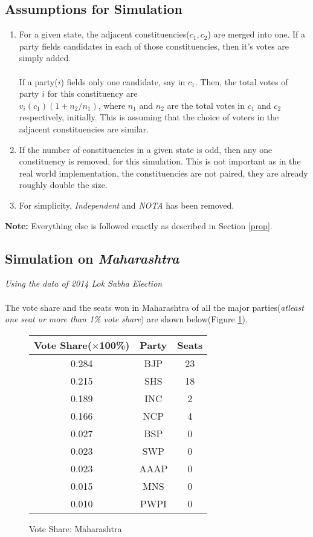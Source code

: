\documentclass{article}
\begin{document}
\subsection{Assumptions for Simulation}
\begin{enumerate}
\item For a given state, the adjacent constituencies($c_1,c_2$) are merged into one. If a party fields candidates in each of those constituencies, then it's votes are simply added. \\ \\
If a party($i$) fields only one candidate, say in $c_1$. Then, the total votes of party $i$ for this constituency are \\$v_i(c_1)(1+n_2/n_1)$, where  $n_1$ and $n_2$ are the total votes in $c_1$ and $c_2$ respectively, initially. This is assuming that the choice of voters in the adjacent constituencies are similar.
\item If the number of constituencies in a given state is odd, then any one constituency is removed, for this simulation. This is not important as in the real world implementation, the constituencies are not paired, they are already roughly double the size.
\item For simplicity, \emph{Independent} and \emph{NOTA} has been removed.
\end{enumerate}
\textbf{Note:} Everything else is followed exactly as described in Section \ref{prop}.

\subsection{Simulation on \emph{Maharashtra}}
\emph{Using the data of 2014 Lok Sabha Election}\\ \\
The vote share and the seats won in Maharashtra of all the major parties(\emph{atleast one seat or more than 1\% vote share}) are shown below(Figure \ref{perc}). 

\begin{figure}[h!]
\begin{center}
\begin{tabular}{|c|c|c|}
\hline
\textbf{Vote Share($\times$100\%)} & \textbf{Party} & \textbf{Seats}\\
\hline
0.284 & BJP & 23\\
0.215 & SHS & 18\\
0.189&INC & 2\\
0.166&NCP & 4\\
0.027&BSP & 0\\
0.023&SWP & 0\\
0.023&AAAP & 0\\
0.015&MNS & 0\\
0.010&PWPI & 0\\
\hline
\end{tabular}
\caption{Vote Share: Maharashtra}
\label{perc}
\end{center}
\end{figure}
\end{document}
